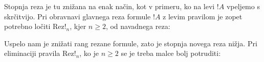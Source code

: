 \begin{prooftree}


\end{prooftree}
\dol
\begin{prooftree}


\end{prooftree}
Stopnja reza je tu znižana na enak način, kot v primeru, ko na levi $!A$ vpeljemo s skrčitvijo. Pri obravnavi glavnega reza formule $!A$ z levim pravilom je zopet potrebno ločiti Rez!$_n$, kjer $n\geq2$, od navadnega reza:
\begin{prooftree}


\end{prooftree}
\dol
\begin{prooftree}
\end{prooftree}
Uspelo nam je znižati rang rezane formule, zato je stopnja novega reza nižja. Pri eliminaciji pravila Rez!$_n$, ko je $n\geq2$ se je treba malce bolj potruditi:
\begin{prooftree}


\end{prooftree}
